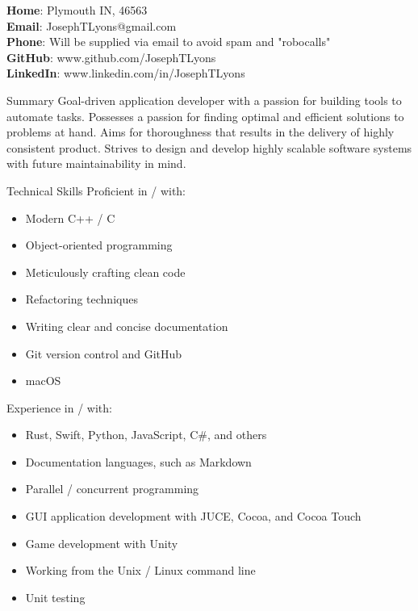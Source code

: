 \documentclass{resume}
\newenvironment{tightlySpacedList}
{ \begin{itemize}
    \setlength{\itemsep}{0pt}
    \setlength{\parskip}{0pt}
    \setlength{\parsep}{0pt}     }
{ \end{itemize}                  }
\begin{document}
\textbf{Home}: Plymouth IN, 46563
\\\textbf{Email}: JosephTLyons@gmail.com
\\\textbf{Phone}: Will be supplied via email to avoid spam and "robocalls"
\\\textbf{GitHub}: www.github.com/JosephTLyons
\\\textbf{LinkedIn}: www.linkedin.com/in/JosephTLyons

\begin{rSection}{Summary}
Goal-driven application developer with a passion for building tools to automate
tasks.  Possesses a passion for finding optimal and efficient solutions to
problems at hand.  Aims for thoroughness that results in the delivery of highly
consistent product.  Strives to design and develop highly scalable software
systems with future maintainability in mind.
\end{rSection}

\begin{rSection}{Technical Skills}
Proficient in / with:

\begin{tightlySpacedList}
    \item Modern C++ / C
    \item Object-oriented programming
    \item Meticulously crafting clean code
    \item Refactoring techniques
    \item Writing clear and concise documentation
    \item Git version control and GitHub
    \item macOS
\end{tightlySpacedList}

Experience in / with:
\begin{tightlySpacedList}
    \item Rust, Swift, Python, JavaScript, C\#, and others
    \item Documentation languages, such as Markdown
    \item Parallel / concurrent programming
    \item GUI application development with JUCE, Cocoa, and Cocoa Touch
    \item Game development with Unity
    \item Working from the Unix / Linux command line
    \item Unit testing
\end{tightlySpacedList}
\end{rSection}
\end{document}
